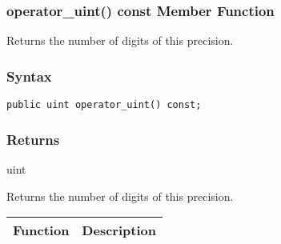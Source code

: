 \documentclass[a4paper,oneside,11.000000pt]{book}
\newcounter{subchapter}
\begin{document}
\hypertarget{System.Numerics.Multiprecision.Precision.operator\_uint.C.P.System.Numerics.Multiprecision.Precision}{\subsubsection*{operator\_uint() const Member Function}}
\begin{flushleft}
Returns the number of digits of this precision.

\end{flushleft}
\subsubsection*{Syntax}\texttt{public uint operator\_uint() const;}

\subsubsection*{Returns}uint
\begin{flushleft}
Returns the number of digits of this precision.

\end{flushleft}
\clearpage
{}
\begin{flushleft}
\begin{supertabular}[l]{ll}
\textbf{Function}
& \textbf{Description}
\\
\hline
\end{supertabular}

\end{flushleft}
\clearpage
\clearpage
\end{document}
